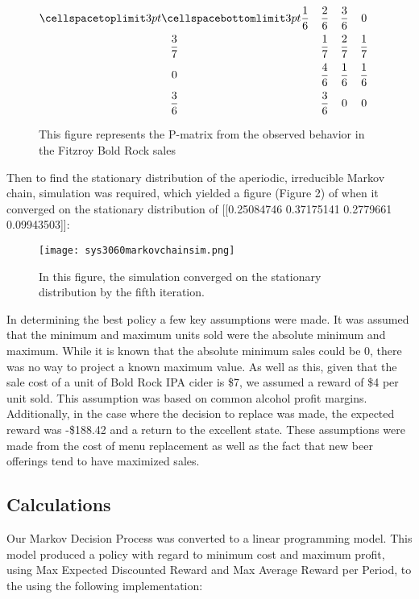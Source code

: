 \documentclass[conference]{IEEEtran}
\begin{document}
\begin{figure}[t]
\centering
$\begin{matrix}
    \cellspacetoplimit 3pt
    \cellspacebottomlimit 3pt
    \setlength{\arraycolsep}{2pt}
\dfrac{1}{6} & \dfrac{2}{6} & \dfrac{3}{6} & 0 \\[2ex]
\dfrac{3}{7} & \dfrac{1}{7} & \dfrac{2}{7} & \dfrac{1}{7} \\[2ex]
0 & \dfrac{4}{6} & \dfrac{1}{6} & \dfrac{1}{6} \\[2ex] 
\dfrac{3}{6} & \dfrac{3}{6} & 0 & 0
\end{matrix}$
\caption{This figure represents the P-matrix from the observed behavior in the Fitzroy Bold Rock sales}
\end{figure}


\vspace{20pt}
Then to find the stationary distribution of the aperiodic, irreducible Markov chain, simulation was required, which yielded a figure (Figure 2) of when it converged on the stationary distribution of [[0.25084746 0.37175141 0.2779661  0.09943503]]:

\begin{figure}[!ht]
\texttt{[image: sys3060markovchainsim.png]}
\centering
\caption{In this figure, the simulation converged on the stationary distribution by the fifth iteration.}
\end{figure}

In determining the best policy a few key assumptions were made.  It was assumed that the minimum and maximum units sold were the absolute minimum and maximum. While it is known that the absolute minimum sales could be 0, there was no way to project a known maximum value.  As well as this, given that the sale cost of a unit of Bold Rock IPA cider is \$7, we assumed a reward of \$4 per unit sold.  This assumption was based on common alcohol profit margins.  Additionally, in the case where the decision to replace was made, the expected reward was -\$188.42 and a return to the excellent state.  These assumptions were made from the cost of menu replacement as well as the fact that new beer offerings tend to have maximized sales. 

\subsection{Calculations}
Our Markov Decision Process was converted to a linear programming model.  This model produced a policy with regard to minimum cost and maximum profit, using Max Expected Discounted Reward and Max Average Reward per Period, to the using the following implementation:
\end{document}
